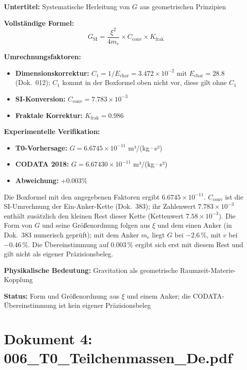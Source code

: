 	\begin{documentbox}
		\textbf{Untertitel:} Systematische Herleitung von $G$ aus geometrischen Prinzipien
		
		\textbf{Vollständige Formel:}
		\begin{equation}
			\boxed{G_{\text{SI}} = \frac{\xi^2}{4 m_e} \times C_{\text{conv}} \times K_{\text{frak}}}
		\end{equation}
		
		\textbf{Umrechnungsfaktoren:}
		\begin{itemize}
			\item \textbf{Dimensionskorrektur:} $C_1 = 1/E_{\text{char}} = 3.472 \times 10^{-2}$ mit $E_{\text{char}} = 28.8$ (Dok.~012); $C_1$ kommt in der Boxformel oben nicht vor, diese gilt ohne $C_1$
			\item \textbf{SI-Konversion:} $C_{\text{conv}} = 7.783 \times 10^{-3}$
			\item \textbf{Fraktale Korrektur:} $K_{\text{frak}} = 0.986$
		\end{itemize}
		
		\textbf{Experimentelle Verifikation:}
		\begin{itemize}
			\item \textbf{T0-Vorhersage:} $G = 6.6745 \times 10^{-11}$ m³/(kg·s²)
			\item \textbf{CODATA 2018:} $G = 6.67430 \times 10^{-11}$ m³/(kg·s²)
			\item \textbf{Abweichung:} +0.003\%
		\end{itemize}
		
		Die Boxformel mit den angegebenen Faktoren ergibt $6.6745\times10^{-11}$. $C_{\text{conv}}$ ist die SI-Umrechnung der Ein-Anker-Kette (Dok.~383); ihr Zahlenwert $7.783\times10^{-3}$ enthält zusätzlich den kleinen Rest dieser Kette (Kettenwert $7.58\times10^{-3}$). Die Form von $G$ und seine Größenordnung folgen aus $\xi$ und dem einen Anker (in Dok.~383 numerisch geprüft); mit dem Anker $m_e$ liegt $G$ bei $-2.6\,\%$, mit $v$ bei $-0.46\,\%$. Die Übereinstimmung auf $0.003\,\%$ ergibt sich erst mit diesem Rest und gilt nicht als eigener Präzisionsbeleg.
		
		\textbf{Physikalische Bedeutung:} Gravitation als geometrische Raumzeit-Materie-Kopplung
		
		\textbf{Status:} Form und Größenordnung aus $\xi$ und einem Anker; die CODATA-Übereinstimmung ist kein eigener Präzisionsbeleg
	\end{documentbox}
	
	\section{Dokument 4: 006\_T0\_Teilchenmassen\_De.pdf}
	
